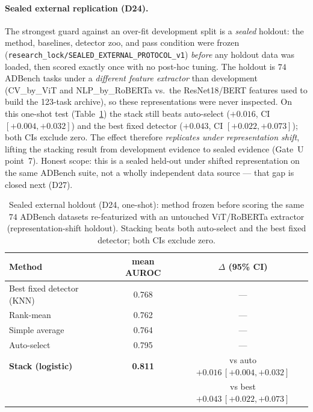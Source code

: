 \documentclass[11pt,titlepage]{article}
\begin{document}
\paragraph{Sealed external replication (D24).}
The strongest guard against an over-fit development split is a \emph{sealed}
holdout: the method, baselines, detector zoo, and pass condition were frozen
(\texttt{research\_lock/SEALED\_EXTERNAL\_PROTOCOL\_v1}) \emph{before} any holdout
data was loaded, then scored exactly once with no post-hoc tuning. The holdout is
$74$ ADBench tasks under a \emph{different feature extractor} than development
(CV\_by\_ViT and NLP\_by\_RoBERTa vs.\ the ResNet18/BERT features used to build the
123-task archive), so these representations were never inspected. On this one-shot
test (Table~\ref{tab:sealed_th}) the stack still beats auto-select ($+0.016$, CI
$[+0.004,+0.032]$) and the best fixed detector ($+0.043$, CI $[+0.022,+0.073]$);
both CIs exclude zero. The effect therefore \emph{replicates under representation
shift}, lifting the stacking result from development evidence to sealed evidence
(Gate~U point~7). Honest scope: this is a sealed held-out under shifted
representation on the same ADBench suite, not a wholly independent data source ---
that gap is closed next (D27).

\begin{table}[H]\centering
\caption{Sealed external holdout (D24, one-shot): method frozen before scoring the
same $74$ ADBench datasets re-featurized with an untouched ViT/RoBERTa extractor
(representation-shift holdout). Stacking beats both auto-select and the best fixed detector; both CIs exclude zero.}
\label{tab:sealed_th}\small
\begin{tabular}{lcc}
\toprule
\textbf{Method} & mean AUROC & $\Delta$ (95\% CI) \\
\midrule
Best fixed detector (KNN) & 0.768 & --- \\
Rank-mean & 0.762 & --- \\
Simple average & 0.764 & --- \\
Auto-select & 0.795 & --- \\
\textbf{Stack (logistic)} & \textbf{0.811} & vs auto $+0.016\,[+0.004,+0.032]$ \\
 & & vs best $+0.043\,[+0.022,+0.073]$ \\
\bottomrule
\end{tabular}
\end{table}
\end{document}
